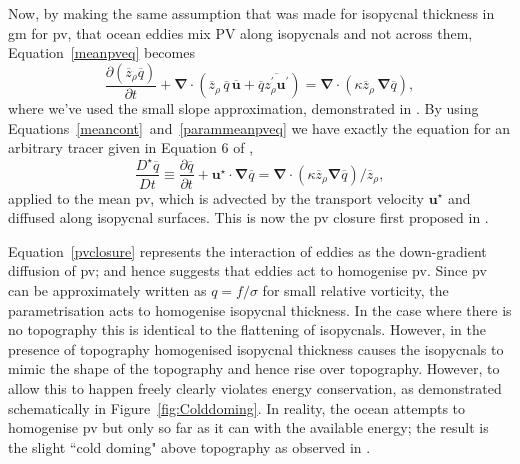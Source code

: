 \documentclass[10pt,a4paper]{article}
\newcommand*\mean[1]{\overline{#1}}
\newcommand*\res[1]{{#1}^{\prime}}
\newcommand*\figref[1]{Figure~\ref{#1}}
\newcommand*\equref[1]{Equation~\ref{#1}}
\begin{document}
                Now, by making the same assumption that was made for isopycnal thickness in 
                \gls{gm} for \gls{pv}, that ocean eddies mix PV along isopycnals and not
                across them, \equref{meanpveq} becomes
                \begin{equation}
                \frac{\partial \left(\mean{z}_{\rho} \mean{q}\right)}{\partial t} +
                \boldsymbol{\nabla}\cdot\left(\mean{z}_{\rho}\,\mean{q}\,\mean{\boldsymbol{u}}+\mean{q}\mean{\res{z}_{\rho} \res{\boldsymbol{u}}}\right)
                = \boldsymbol{\nabla}\cdot\left(\kappa \mean{z}_{\rho}\,\boldsymbol{\nabla}\mean{q}\right) ,
                \label{parammeanpveq}
                \end{equation}
                where we've used the small slope approximation, demonstrated in \cite{gent1990}. By using Equations~\ref{meancont}~and~\ref{parammeanpveq} we have exactly the equation for an arbitrary tracer given in Equation 6 of \cite{gent1995parameterizing},
                \begin{equation}
                \frac{D^\star \mean{q}}{D t}\equiv\frac{\partial \mean{q}}{\partial t} + \boldsymbol{u}^\star\cdot\boldsymbol{\nabla}\mean{q} = \boldsymbol{\nabla}\cdot
                \left(\kappa \mean{z}_{\rho}\boldsymbol{\nabla} \mean{q} \right)/\mean{z}_{\rho} ,
                \label{pvclosure}
                \end{equation}
                applied to the mean \gls{pv}, which is advected by the transport velocity $\boldsymbol{u}^\star$ and diffused along isopycnal surfaces. This is now
                the \gls{pv} closure first proposed in \cite{greatbatch1998exploring}.
                
                \equref{pvclosure} represents the interaction of eddies as the
                down-gradient diffusion of \gls{pv}; and hence suggests that eddies
                act to homogenise \gls{pv}. Since \gls{pv} can be approximately written
                as $q=f/\sigma$ for small relative vorticity, the parametrisation acts  to homogenise isopycnal thickness. In the case 
                where there is no topography this is identical to the flattening of isopycnals.
                However, in the presence of topography homogenised isopycnal thickness
                causes the isopycnals to mimic the shape of the topography and hence 
                rise over topography. However, to allow this to happen freely
                clearly violates energy conservation, as demonstrated schematically in 
                \figref{fig:Colddoming}. In reality, the ocean attempts to 
                homogenise \gls{pv} but only so far as it can with the available energy;
                the result is the slight ``cold doming" above topography as observed in
                \cite{adcock2000interactions}. 
                
\end{document}
